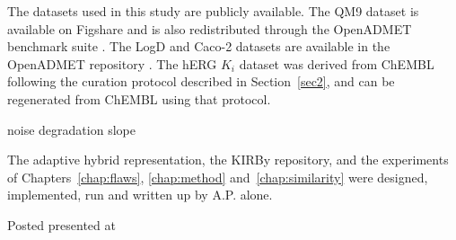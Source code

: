 The datasets used in this study are publicly available. The QM9 dataset is available on Figshare \citep{qm9_dataset} and is also redistributed through the OpenADMET benchmark suite \citep{Ramakrishnan2014, openadmet}. The LogD and Caco-2 datasets are available in the OpenADMET repository \citep{openadmet}. The hERG $K_i$ dataset was derived from ChEMBL \citep{Zdrazil2023} following the curation protocol described in Section~\ref{sec2}, and can be regenerated from ChEMBL using that protocol.


noise degradation slope

The adaptive hybrid representation, the KIRBy repository, and the experiments of Chapters~\ref{chap:flaws}, \ref{chap:method} and~\ref{chap:similarity} were designed, implemented, run and written up by A.P. alone.

Posted presented at

